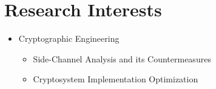\documentclass[a4paper,20pt]{article}
\begin{document}
\section{\textbf{Research Interests}}
\begin{itemize}
    \item {Cryptographic Engineering}
    \vspace{-4pt}
    \begin{itemize}
        \item {Side-Channel Analysis and its Countermeasures}
        \vspace{-2pt}
        \item {Cryptosystem Implementation Optimization}
    \end{itemize}
\end{itemize}
\end{document}
